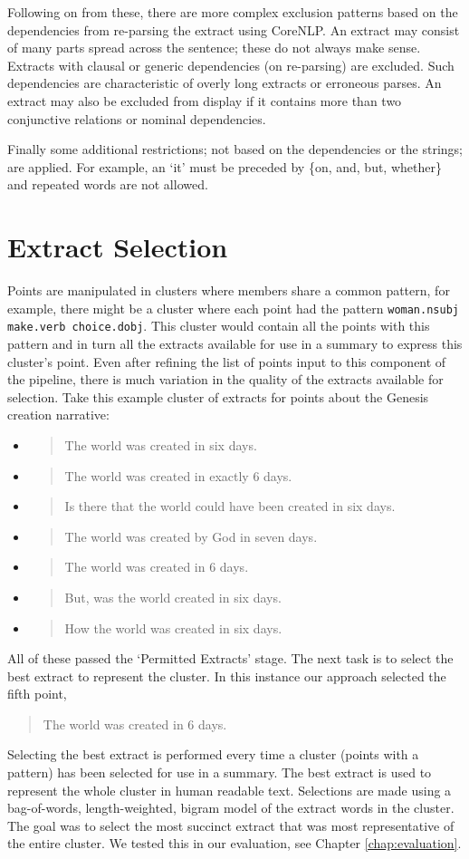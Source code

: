     Following on from these, there are more complex exclusion patterns based on the dependencies from re-parsing the extract using CoreNLP. An extract may consist of many parts spread across the sentence; these do not always make sense. Extracts with clausal or generic dependencies (on re-parsing) are excluded. Such dependencies are characteristic of overly long extracts or erroneous parses. An extract may also be excluded from display if it contains more than two conjunctive relations or nominal dependencies.

    Finally some additional restrictions; not based on the dependencies or the strings; are applied. For example, an `it' must be preceded by \{on, and, but, whether\} and repeated words are not allowed.

  \section{Extract Selection}
    Points are manipulated in clusters where members share a common pattern, for example, there might be a cluster where each point had the pattern \texttt{woman.nsubj make.verb choice.dobj}. This cluster would contain all the points with this pattern and in turn all the extracts available for use in a summary to express this cluster's point. Even after refining the list of points input to this component of the pipeline, there is much variation in the quality of the extracts available for selection. Take this example cluster of extracts for points about the Genesis creation narrative:

    \begin{itemize}[label={}]
      \item{\blockquote{The world was created in six days.}}
      \item{\blockquote{The world was created in exactly 6 days.}}
      \item{\blockquote{Is there that the world could have been created in six days.}}
      \item{\blockquote{The world was created by God in seven days.}}
      \item{\blockquote{The world was created in 6 days.}}
      \item{\blockquote{But, was the world created in six days.}}
      \item{\blockquote{How the world was created in six days.}}
    \end{itemize}

    All of these passed the `Permitted Extracts' stage. The next task is to select the best extract to represent the cluster. In this instance our approach selected the fifth point, \blockquote{The world was created in 6 days.}. Selecting the best extract is performed every time a cluster (points with a pattern) has been selected for use in a summary. The best extract is used to represent the whole cluster in human readable text. Selections are made using a bag-of-words, length-weighted, bigram model of the extract words in the cluster. The goal was to select the most succinct extract that was most representative of the entire cluster. We tested this in our evaluation, see Chapter \ref{chap:evaluation}.

